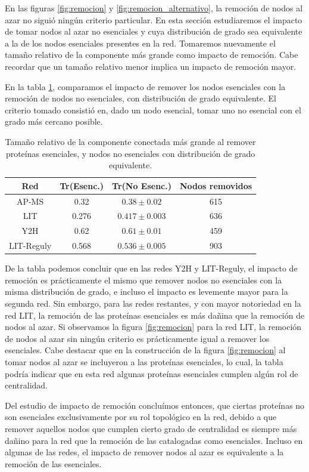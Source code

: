 \par En las figuras \ref{fig:remocion} y \ref{fig:remocion_alternativo}, la remoción de nodos al azar no siguió ningún criterio particular. En esta sección estudiaremos el impacto de tomar nodos al azar no esenciales y cuya distribución de grado sea equivalente a la de los nodos esenciales presentes en la red. Tomaremos nuevamente el tamaño relativo de la componente más grande como impacto de remoción. Cabe recordar que un tamaño relativo menor implica un impacto de remoción mayor.
\par En la tabla \ref{table:remocion}, comparamos el impacto de remover los nodos esenciales con la remoción de nodos no esenciales, con distribución de grado equivalente. El criterio tomado consistió en, dado un nodo esencial, tomar uno no esencial con el grado más cercano posible.
\begin{table}
\centering
\begin{tabular}{c c c c}
\hline \hline
Red & Tr(Esenc.) & Tr(No Esenc.) & Nodos removidos \\
\hline
AP-MS & 0.32 & $0.38 \pm 0.02$ & 615 \\
LIT & 0.276 & $0.417 \pm 0.003$ & 636 \\
Y2H & 0.62 & $0.61 \pm 0.01$ & 459 \\
LIT-Reguly & 0.568 & $0.536 \pm 0.005$ & 903 \\
\hline\hline
\end{tabular}
\caption{Tamaño relativo de la componente conectada más grande al remover proteínas esenciales, y nodos no esenciales con distribución de grado equivalente.}
\label{table:remocion}
\end{table}
\par De la tabla podemos concluir que en las redes Y2H y LIT-Reguly, el impacto de remoción es prácticamente el mismo que remover nodos no esenciales con la misma distribución de grado, e incluso el impacto es levemente mayor para la segunda red. Sin embargo, para las redes restantes, y con mayor notoriedad en la red LIT, la remoción de las proteínas esenciales es más dañina que la remoción de nodos al azar. Si observamos la figura \ref{fig:remocion} para la red LIT, la remoción de nodos al azar sin ningún criterio es prácticamente igual a remover los esenciales. Cabe destacar que en la construcción de la figura \ref{fig:remocion} al tomar nodos al azar se incluyeron a las proteínas esenciales, lo cual, la tabla podría indicar que en esta red algunas proteínas esenciales cumplen algún rol de centralidad.
\par Del estudio de impacto de remoción concluímos entonces, que ciertas proteínas no son esenciales exclusivamente por su rol topológico en la red, debido a que remover aquellos nodos que cumplen cierto grado de centralidad es siempre más dañino para la red que la remoción de las catalogadas como esenciales. Incluso en algunas de las redes, el impacto de remover nodos al azar es equivalente a la remoción de las esenciales.


